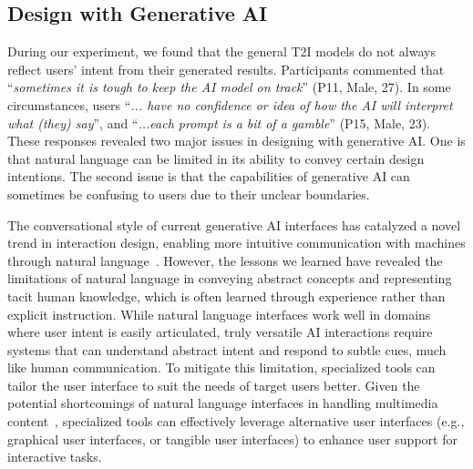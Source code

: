 \subsection{Design with Generative AI}

During our experiment, we found that the general T2I models do not always reflect users' intent from their generated results. 
Participants commented that ``\textit{sometimes it is tough to keep the AI model on track}'' (P11, Male, 27). 
In some circumstances, users ``\textit{... have no confidence or idea of how the AI will interpret what (they) say}'', and ``\textit{...each prompt is a bit of a gamble}'' (P15, Male, 23). 
These responses revealed two major issues in designing with generative AI.
One is that natural language can be limited in its ability to convey certain design intentions.
The second issue is that the capabilities of generative AI can sometimes be confusing to users due to their unclear boundaries.




The conversational style of current generative AI interfaces has catalyzed a novel trend in interaction design, enabling more intuitive communication with machines through natural language~\cite{10.1007/978-3-031-66329-1_41, 10.1007/978-3-031-48038-6_36}.
However, the lessons we learned have revealed the limitations of natural language in conveying abstract concepts and representing tacit human knowledge, which is often learned through experience rather than explicit instruction.
While natural language interfaces work well in domains where user intent is easily articulated, truly versatile AI interactions require systems that can understand abstract intent and respond to subtle cues, much like human communication.
To mitigate this limitation, specialized tools can tailor the user interface to suit the needs of target users better.
Given the potential shortcomings of natural language interfaces in handling multimedia content~\cite{voigt-etal-2021-challenges}, specialized tools can effectively leverage alternative user interfaces (e.g., graphical user interfaces, or tangible user interfaces) to enhance user support for interactive tasks. 



